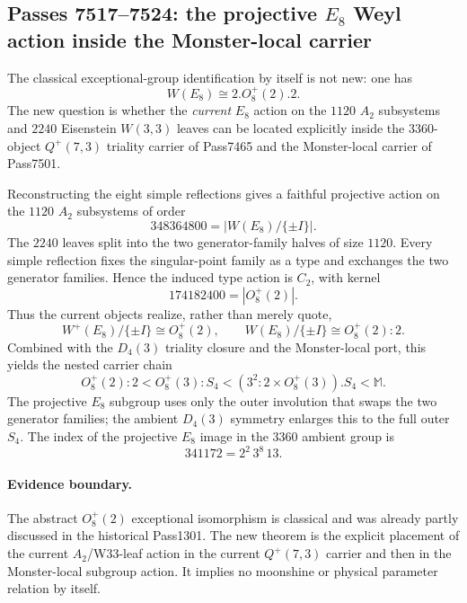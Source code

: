 \subsection*{Passes 7517--7524: the projective $E_8$ Weyl action inside the Monster-local carrier}

The classical exceptional-group identification by itself is not new: one has
\[
W(E_8)\cong 2.O_8^+(2).2.
\]
The new question is whether the \emph{current} $E_8$ action on the $1120$ $A_2$
subsystems and $2240$ Eisenstein $W(3,3)$ leaves can be located explicitly inside
the $3360$-object $Q^+(7,3)$ triality carrier of Pass7465 and the Monster-local
carrier of Pass7501.

Reconstructing the eight simple reflections gives a faithful projective action
on the $1120$ $A_2$ subsystems of order
\[
\boxed{348364800=|W(E_8)/\{\pm I\}|}.
\]
The $2240$ leaves split into the two generator-family halves of size $1120$.
Every simple reflection fixes the singular-point family as a type and exchanges
the two generator families.  Hence the induced type action is $C_2$, with kernel
\[
\boxed{174182400=|O_8^+(2)|}.
\]
Thus the current objects realize, rather than merely quote,
\[
\boxed{W^+(E_8)/\{\pm I\}\cong O_8^+(2)},
\qquad
\boxed{W(E_8)/\{\pm I\}\cong O_8^+(2):2}.
\]
Combined with the $D_4(3)$ triality closure and the Monster-local port, this yields
the nested carrier chain
\[
\boxed{
O_8^+(2):2
< O_8^+(3):S_4
< (3^2{:}2\times O_8^+(3)).S_4
< \mathbb M.
}
\]
The projective $E_8$ subgroup uses only the outer involution that swaps the two
generator families; the ambient $D_4(3)$ symmetry enlarges this to the full outer
$S_4$.  The index of the projective $E_8$ image in the $3360$ ambient group is
\[
\boxed{341172=2^2\,3^8\,13}.
\]

\paragraph{Evidence boundary.}
The abstract $O_8^+(2)$ exceptional isomorphism is classical and was already
partly discussed in the historical Pass1301.  The new theorem is the explicit
placement of the current $A_2$/W33-leaf action in the current $Q^+(7,3)$ carrier
and then in the Monster-local subgroup action.  It implies no moonshine or
physical parameter relation by itself.
